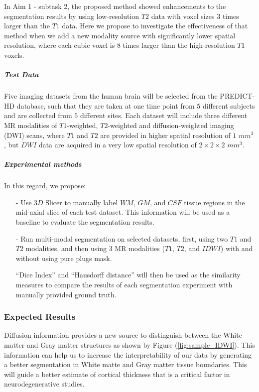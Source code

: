 In Aim 1 - subtask 2, the proposed method showed enhancements to the segmentation results by using low-resolution $T2$ data with voxel sizes $3$ times larger than the $T1$ data.
Here we propose to investigate the effectiveness of that method when we add a new modality source with significantly lower spatial resolution, where each cubic voxel is $8$ times larger than the high-resolution $T1$ voxels.

\subparagraph{Test Data}

Five imaging datasets from the human brain will be selected from the PREDICT-HD database, such that they are taken at one time point from $5$ different subjects and are collected from $5$ different sites. Each dataset will include three different MR modalities of $T1$-weighted, $T2$-weighted and diffusion-weighted imaging (DWI) scans, where $T1$ and $T2$ are provided in higher spatial resolution of $1$ $mm^3$, but $DWI$ data are acquired in a very low spatial resolution of $2 \times 2 \times 2$ $mm^3$.

\subparagraph{Experimental methods}

In this regard, we propose:
\begin{itemize}
    \item[-] Use $3D$ Slicer \cite{slicer_paper} to manually label $WM$, $GM$, and $CSF$ tissue regions in the mid-axial slice of each test dataset. This information will be used as a baseline to evaluate the segmentation results.
    \item[-] Run multi-modal segmentation on selected datasets, first, using two $T1$ and $T2$ modalities, and then using $3$ MR modalities ($T1$, $T2$, and $IDWI$) with and without using pure plugs mask.
    
    ``Dice Index'' and ``Hausdorff distance'' will then be used as the similarity measures to compare the results of each segmentation experiment with manually provided ground truth.
\end{itemize}

\subsubsection{Expected Results}

Diffusion information provides a new source to distinguish between the White matter and Gray matter structures as shown by Figure (\ref{fig:sample_IDWI}). This information can help us to increase the interpretability of our data by generating a better segmentation in White matte and Gray matter tissue boundaries. This will guide a better estimate of cortical thickness that is a critical factor in neurodegenerative studies.
\newline

